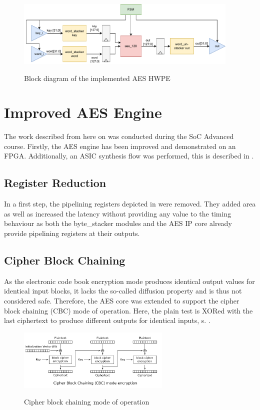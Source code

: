 \documentclass[a4paper, 12pt]{article}
\begin{document}
\begin{figure} [h]
	\centering
	\includegraphics[width=0.95\textwidth]{hwpe_aes.pdf}
	\label{hwpe-aes}
	\caption{Block diagram of the implemented AES HWPE}
\end{figure}

\section{Improved AES Engine} \label{sec:improvements}

The work described from here on was conducted during the SoC Advanced course. Firstly, the AES engine has been improved and demonstrated on an FPGA. Additionally, an ASIC synthesis flow was performed, this is described in .

\subsection{Register Reduction}

In a first step, the pipelining registers depicted in  were removed. They added area as well as increased the latency without providing any value to the timing behaviour as both the byte\_stacker modules and the AES IP core already provide pipelining registers at their outputs.

\subsection{Cipher Block Chaining}

As the electronic code book encryption mode produces identical output values for identical input blocks, it lacks the so-called diffusion property and is thus not considered safe. Therefore, the AES core was extended to support the cipher block chaining (CBC) mode of operation. Here, the plain test is XORed with the last ciphertext to produce different outputs for identical inputs, s. .

\begin{figure} [h]
	\centering
	\includegraphics[width=0.65\textwidth]{cbc.png}
	\label{fig:cbc}
	\caption{Cipher block chaining mode of operation \cite{wiki_cbc}}
\end{figure}
\end{document}
